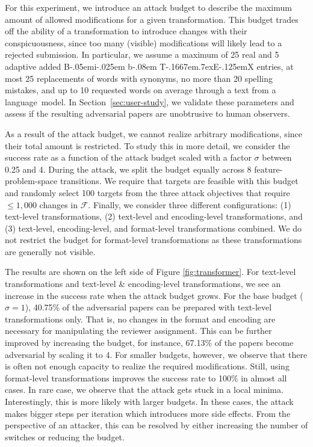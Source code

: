 \documentclass[letterpaper,twocolumn,10pt]{article}
\def\BibTeX{{\rm B\kern-.05em{\sc i\kern-.025em b}\kern-.08em
    T\kern-.1667em\lower.7ex\hbox{E}\kern-.125emX}}
\newcommand{\attackbudgetscale}{\sigma}
\newcommand{\F}{\ensuremath{\mathcal{F}}\xspace}
\begin{document}
For this experiment, we introduce an attack budget to describe the maximum amount of allowed modifications for a given transformation. This budget trades off the ability of a transformation to introduce changes with their conspicuousness, since too many (visible) modifications will likely lead to a rejected submission. In particular, we assume a maximum of 25 real and 5 adaptive added \BibTeX{} entries, at most 25 replacements of words with synonyms, no more than 20 spelling mistakes, and up to 10 requested words on average through a text from a \mbox{language model}. In Section~\ref{sec:user-study}, we validate these parameters and assess if the resulting adversarial papers are unobtrusive to human observers.

As a result of the attack budget, we cannot realize arbitrary modifications, since their total amount is restricted. To study this in more detail, we consider the success rate as a function of the attack budget scaled with a factor $\attackbudgetscale$ between 0.25 and 4. During the attack, we split the budget equally across 8 feature-problem-space transitions. We require that targets are feasible with this budget and randomly select 100 targets from the three attack objectives that require $\leq 1,000$ changes in $\F$. Finally, we consider three different configurations: (1) text-level transformations, (2) text-level and encoding-level transformations, and (3) text-level, encoding-level, and format-level transformations combined. We do not restrict the budget for format-level transformations as these transformations are generally not visible.

The results are shown on the left side of Figure \ref{fig:transformer}. For text-level transformations and text-level \& encoding-level transformations, we see an increase in the success rate when the attack budget grows. For the base budget ($\sigma=1$), 40.75\% of the adversarial papers can be prepared with text-level transformations only. That is, no changes in the format and encoding are necessary for manipulating the reviewer assignment.
This can be further improved by increasing the budget, for instance, 67.13\% of the papers become adversarial by scaling it to 4. For smaller budgets, however, we observe that there is often not enough capacity to realize the required modifications. Still, using format-level transformations improves the success rate to 100\% in almost all cases. In rare case, we observe that the attack gets stuck in a local minima. Interestingly, this is more likely with larger budgets. In these cases, the attack makes bigger steps per iteration which introduces more side effects. From the perspective of an attacker, this can be resolved by either increasing the number of switches or reducing the budget.
\end{document}
